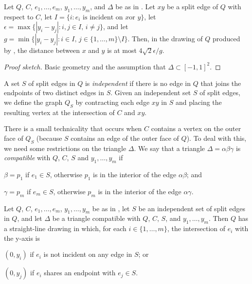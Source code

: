 \documentclass{patmorin}
\begin{document}
\begin{lem}
  Let $Q$, $C$, $e_1,\ldots,e_m$, $y_1,\ldots,y_m$, and $\Delta$ be as in 
  .
  Let $xy$ be a split edge of $Q$ with respect to $C$, 
  let $I=\{i:\text{$e_i$ is incident on $x$
  or $y$}\}$, let $\epsilon=\max\{|y_i-y_j|:i,j\in I,\, i\neq j\}$,
  and let $g=\min\{|y_i-y_j|: i\in I,\, j\in\{1,\ldots,m\}\setminus I\}$.
  Then, in the drawing of $Q$ produced by , the distance between $x$ and $y$ is at most $4\sqrt{2}\epsilon/g$.
\end{lem}

\begin{proof}[Proof sketch]
  Basic geometry and the assumption that $\Delta\subset[-1,1]^2$.
\end{proof}

A set $S$ of split edges in $Q$ is \emph{independent} if there is no
edge in $Q$ that joins the endpoints of two distinct edges in $S$.
Given an independent set $S$ of split edges, we define the graph $Q_S$
by contracting each edge $xy$ in $S$ and placing the resulting vertex
at the intersection of $C$ and $xy$.

There is a small technicality that occurs when $C$ contains a vertex
on the outer face of $Q_S$ (because $S$ contains an edge of the outer
face of $Q$).  To deal with this, we need some restrictions on the
triangle $\Delta$.  We say that a triangle $\Delta=\alpha\beta\gamma$
is \emph{compatible} with $Q$, $C$, $S$ and $y_1,\ldots,y_m$ if
\begin{compactenum}
  \item $\beta=p_1$ if $e_1\in S$, otherwise $p_1$ is in the interior
  of the edge $\alpha\beta$; and
  \item $\gamma=p_m$ if $e_m\in S$, otherwise $p_m$ is in the interior
  of the edge $\alpha\gamma$.
\end{compactenum}

\begin{thm}
   Let $Q$, $C$, $e_1,\ldots,e_m$, $y_1,\ldots,y_m$ be as in
  , let $S$ be an independent set of split edges in $Q$,
  and let $\Delta$ be a triangle compatible with $Q$, $C$, $S$, and
  $y_1,\ldots,y_m$.  Then $Q$ has a straight-line drawing in which, for
  each $i\in\{1,\ldots,m\}$, the intersection of $e_i$ with the y-axis is
  \begin{compactenum}
     \item $(0,y_i)$ if $e_i$ is not incident on any edge in $S$; or
     \item $(0,y_j)$ if $e_i$ shares an endpoint with $e_j\in S$.
  \end{compactenum}
\end{thm}
\end{document}
